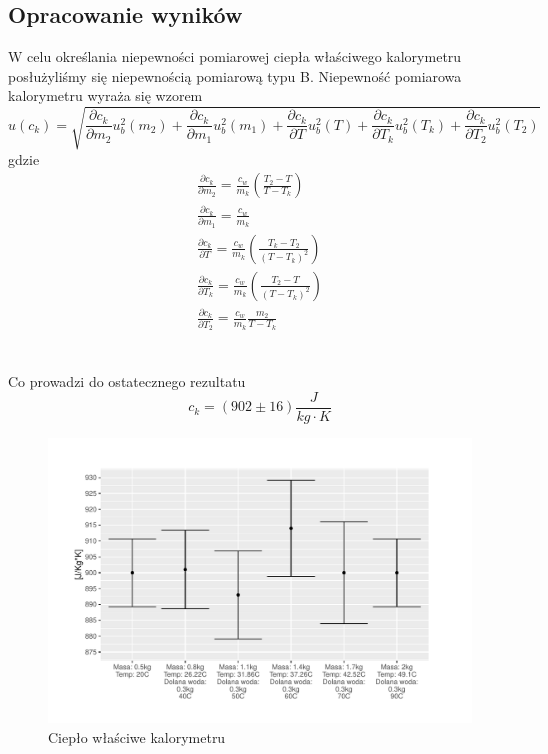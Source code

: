 \documentclass{article}
\begin{document}
\clearpage
\subsection{Opracowanie wyników}
W celu określania niepewności pomiarowej ciepła właściwego kalorymetru posłużyliśmy się niepewnością pomiarową typu B. Niepewność pomiarowa kalorymetru wyraża się wzorem
$$
    u(c_{k})= \sqrt{  
     \frac{\partial c_k}{\partial m_{2} } u^2_b(m_{2}) +
     \frac{\partial c_k}{\partial m_{1} } u^2_b(m_{1}) +
     \frac{\partial c_k}{\partial T } u^2_b(T) + 
     \frac{\partial c_k}{\partial T_{k} } u^2_b(T_{k}) +
     \frac{\partial c_k}{\partial T_{2} } u^2_b(T_{2})
    }   
$$
gdzie
\begin{gather*}
    \frac{\partial c_k}{\partial m_{2} } = \frac{c_{w}}{m_k} \left(  \frac{T_2 - T}{T - T_k} \right) \\
    \frac{\partial c_k}{\partial m_{1} } = \frac{c_{w}}{m_k} \\
    \frac{\partial c_k}{\partial T } = \frac{c_{w}}{m_k} \left(  \frac{T_k - T_2}{(T - T_k)^2} \right) \\
    \frac{\partial c_k}{\partial T_{k} } = \frac{c_{w}}{m_k} \left(  \frac{T_2 - T}{(T - T_k)^2} \right) \\
    \frac{\partial c_k}{\partial T_2 } = \frac{c_{w}}{m_k} \frac{m_2}{T - T_k}
\end{gather*}
\\\\Co prowadzi do ostatecznego rezultatu
$$
c_k=(902\pm 16)\frac{J}{kg \cdot K}
$$
    \begin{figure}[h!]
    \centerline{\includegraphics[scale=0.65]{kalorymetr}}
    \caption{Ciepło właściwe kalorymetru}
    \end{figure}
\end{document}
